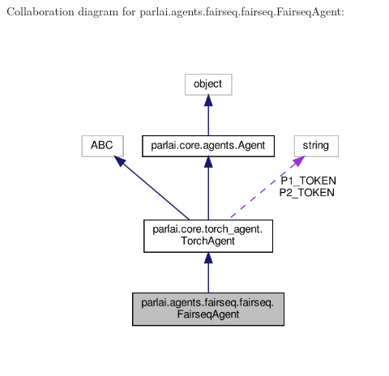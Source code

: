 Collaboration diagram for parlai.\+agents.\+fairseq.\+fairseq.\+Fairseq\+Agent\+:
\nopagebreak
\begin{figure}[H]
\begin{center}
\leavevmode
\includegraphics[width=318pt]{classparlai_1_1agents_1_1fairseq_1_1fairseq_1_1FairseqAgent__coll__graph}
\end{center}
\end{figure}
